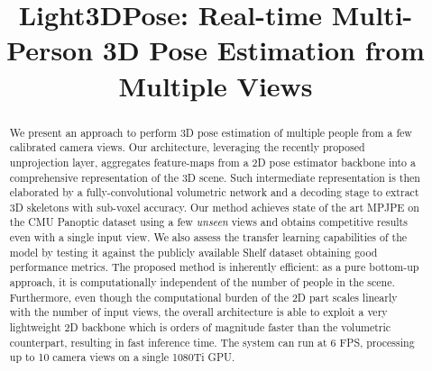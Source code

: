 \documentclass[a4paper,conference]{IEEEtran}
\newcommand{\thename}{Light3DPose}
\begin{document}
\title{\thename: Real-time Multi-Person 3D Pose Estimation from Multiple Views}


\author{
}













\maketitle

\begin{abstract}
We present an approach to perform 3D pose estimation of multiple people from a few calibrated camera views. Our architecture, leveraging the recently proposed unprojection layer, aggregates feature-maps from a 2D pose estimator backbone into a comprehensive representation of the 3D scene. Such intermediate representation is then elaborated by a fully-convolutional volumetric network and a decoding stage to extract 3D skeletons with sub-voxel accuracy. Our method achieves state of the art MPJPE on the CMU Panoptic dataset using a few \emph{unseen} views and obtains competitive results even with a single input view. We also assess the transfer learning capabilities of the model by testing it against the publicly available Shelf dataset obtaining good performance metrics. The proposed method is inherently efficient: as a pure bottom-up approach, it is computationally independent of the number of people in the scene. Furthermore, even though the computational burden of the 2D part scales linearly with the number of input views, the overall architecture is able to exploit a very lightweight 2D backbone which is orders of magnitude faster than the volumetric counterpart, resulting in fast inference time. The system can run at 6 FPS, processing up to 10 camera views on a single 1080Ti GPU. 
\end{abstract}






\IEEEpeerreviewmaketitle
\end{document}
